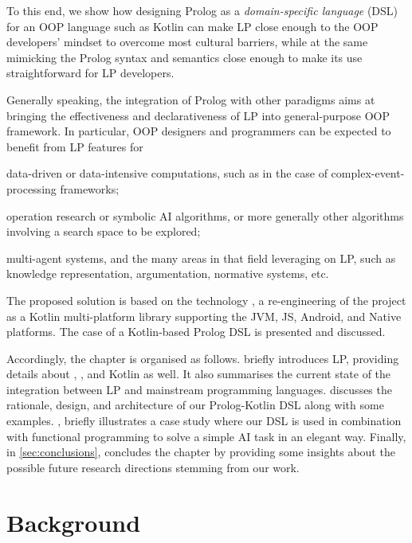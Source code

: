 \documentclass[12pt,a4paper,openright,twoside]{book}
\begin{document}
To this end, we show how designing Prolog as a \emph{domain-specific language} (DSL) for an OOP language such as Kotlin can make LP close enough to the OOP developers' mindset to overcome most cultural barriers, while at the same mimicking the Prolog syntax and semantics close enough to make its use straightforward for LP developers.

Generally speaking, the integration of Prolog with other paradigms aims at bringing the effectiveness and declarativeness of LP into general-purpose OOP framework.
%
In particular, OOP designers and programmers can be expected to benefit from LP features for
%
\begin{inlinelist}
    \item data-driven or data-intensive computations, such as in the case of complex-event-processing frameworks;
    \item operation research or symbolic AI algorithms, or more generally other algorithms involving a search space to be explored;
    \item multi-agent systems, and the many areas in that field leveraging on LP, such as knowledge representation, argumentation, normative systems, etc.
\end{inlinelist}

The proposed solution is based on the \twopkt{} technology \cite{homepage2PKt,cco-softwarex-2021-2pkt}, a re-engineering of the \tuprolog{} project \cite{homepageTuprolog,tuprolog-padl01} as a Kotlin multi-platform library supporting the JVM, JS, Android, and Native platforms.
%
The case of a Kotlin-based Prolog DSL is presented and discussed.

Accordingly, the chapter is organised as follows.
%
 briefly introduces LP, providing details about \tuprolog{}, \twopkt{}, and Kotlin as well.
%
It also summarises the current state of the integration between LP and mainstream programming languages.
%
 discusses the rationale, design, and architecture of our Prolog-Kotlin DSL along with some examples.
%
, briefly illustrates a case study where our DSL is used in combination with functional programming to solve a simple AI task in an elegant way.
%
Finally, in \cref{sec:conclusions}, concludes the chapter by providing some insights about the possible future research directions stemming from our work.

\section{Background}\label{sec:sota}
\end{document}
